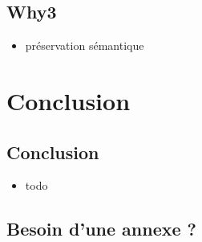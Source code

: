 \documentclass[11pt,usenames,dvipsnames]{beamer}
\begin{document}
\subsection{Why3}
\begin{frame}{\null}
  \begin{itemize}
    \item préservation sémantique
  \end{itemize}
\end{frame}



\section{Conclusion}
\subsection{Conclusion}
\begin{frame}{\null}
  \begin{itemize}
  \item todo
  \end{itemize}
\end{frame}

\appendix
\subsection{Besoin d'une annexe ?}
\begin{frame}{\null}
\end{frame}
\end{document}
